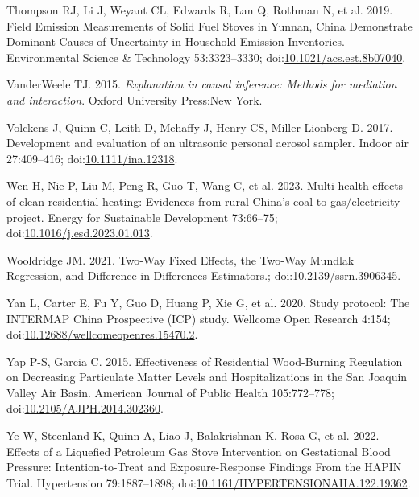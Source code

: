 \documentclass[
  letterpaper,
  DIV=11,
  numbers=noendperiod]{scrartcl}
\newlength{\cslhangindent}
\newlength{\cslentryspacingunit} %
\newenvironment{CSLReferences}[2] %
 {%
  \setlength{\parindent}{0pt}
  \ifodd #1
  \let\oldpar\par
  \def\par{\hangindent=\cslhangindent\oldpar}
  \fi
  \setlength{\parskip}{#2\cslentryspacingunit}
 }%
 {}
\begin{document}
\begin{CSLReferences}{1}{0}
\leavevmode{}%
Thompson RJ, Li J, Weyant CL, Edwards R, Lan Q, Rothman N, et al. 2019.
Field {Emission Measurements} of {Solid Fuel Stoves} in {Yunnan}, {China
Demonstrate Dominant Causes} of {Uncertainty} in {Household Emission
Inventories}. Environmental Science \& Technology 53:3323--3330;
doi:\href{https://doi.org/10.1021/acs.est.8b07040}{10.1021/acs.est.8b07040}.

\leavevmode{}%
VanderWeele TJ. 2015. \emph{Explanation in causal inference: Methods for
mediation and interaction}. Oxford University Press:New York.

\leavevmode{}%
Volckens J, Quinn C, Leith D, Mehaffy J, Henry CS, Miller-Lionberg D.
2017. Development and evaluation of an ultrasonic personal aerosol
sampler. Indoor air 27:409--416;
doi:\href{https://doi.org/10.1111/ina.12318}{10.1111/ina.12318}.

\leavevmode{}%
Wen H, Nie P, Liu M, Peng R, Guo T, Wang C, et al. 2023. Multi-health
effects of clean residential heating: {Evidences} from rural {China}'s
coal-to-gas/electricity project. Energy for Sustainable Development
73:66--75;
doi:\href{https://doi.org/10.1016/j.esd.2023.01.013}{10.1016/j.esd.2023.01.013}.

\leavevmode{}%
Wooldridge JM. 2021. Two-{Way Fixed Effects}, the {Two-Way Mundlak
Regression}, and {Difference-in-Differences Estimators}.;
doi:\href{https://doi.org/10.2139/ssrn.3906345}{10.2139/ssrn.3906345}.

\leavevmode{}%
Yan L, Carter E, Fu Y, Guo D, Huang P, Xie G, et al. 2020. Study
protocol: {The INTERMAP China Prospective} ({ICP}) study. Wellcome Open
Research 4:154;
doi:\href{https://doi.org/10.12688/wellcomeopenres.15470.2}{10.12688/wellcomeopenres.15470.2}.

\leavevmode{}%
Yap P-S, Garcia C. 2015. Effectiveness of {Residential Wood-Burning
Regulation} on {Decreasing Particulate Matter Levels} and
{Hospitalizations} in the {San Joaquin Valley Air Basin}. American
Journal of Public Health 105:772--778;
doi:\href{https://doi.org/10.2105/AJPH.2014.302360}{10.2105/AJPH.2014.302360}.

\leavevmode{}%
Ye W, Steenland K, Quinn A, Liao J, Balakrishnan K, Rosa G, et al. 2022.
Effects of a {Liquefied Petroleum Gas Stove Intervention} on
{Gestational Blood Pressure}: {Intention-to-Treat} and
{Exposure-Response Findings From} the {HAPIN Trial}. Hypertension
79:1887--1898;
doi:\href{https://doi.org/10.1161/HYPERTENSIONAHA.122.19362}{10.1161/HYPERTENSIONAHA.122.19362}.


\end{CSLReferences}
\end{document}
